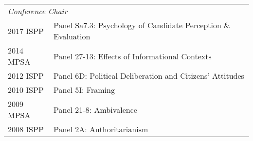 \documentclass[12pt]{article}
\begin{document}
\begin{longtable}{@{}p{3.5cm}@{}l}%
    \multicolumn{2}{l}{\textit{Conference Chair}}\\
            2017 ISPP & {Panel Sa7.3: Psychology of Candidate 
            Perception \& Evaluation}\\    
    
            2014 MPSA & {Panel 27-13: Effects 
            of Informational Contexts}\\
            
            2012 ISPP & {Panel 6D: Political 
            Deliberation and Citizens' Attitudes}\\
            
            2010 ISPP & {Panel 5I: Framing}\\
            
            2009 MPSA & {Panel 21-8: Ambivalence}\\
            
            2008 ISPP & {Panel 2A: Authoritarianism}\\
\end{longtable}
\end{document}
